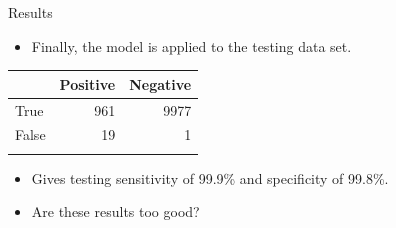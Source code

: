 \documentclass{beamer}
\begin{document}
\begin{frame}{Results}
\begin{itemize}
\item Finally, the model is applied to the testing data set.
\end{itemize}
\begin{table}[ht]
	\centering
	\begin{tabular}{@{}lrr@{}}
	\toprule[1.5pt]
	& Positive & Negative\\
	\midrule
	True & 961 & 9977\\
	False & 19 & 1\\
	\bottomrule[1.5pt]\\
	\end{tabular}
\end{table}
\begin{itemize}
\item Gives testing sensitivity of 99.9\% and specificity of 99.8\%.
\pause
\item Are these results too good?
\end{itemize}
\end{frame}
\end{document}
